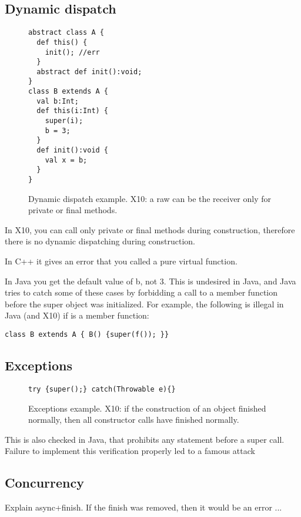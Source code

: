 \subsection{Dynamic dispatch}


\begin{figure}
\begin{lstlisting}
abstract class A {
  def this() {
    init(); //err
  }
  abstract def init():void;
}
class B extends A {
  val b:Int;
  def this(i:Int) {
    super(i);
    b = 3;
  }
  def init():void {
    val x = b;
  }
}
\end{lstlisting}
\caption{Dynamic dispatch example.
    X10: a raw \this can be the receiver only for private or final methods.}
\label{Figure:Dynamic-dispatch}
\end{figure}


In X10, you can call only private or final methods
    during construction,
    therefore there is no dynamic dispatching during construction.

In C++ it gives an error that you called a pure virtual function.

In Java you get the default value of b, not 3.
This is undesired in Java, and Java tries to catch some of these cases by
    forbidding a call to a member function before the super object was initialized.
For example, the following is illegal in Java (and X10) if  is a member function:
\begin{lstlisting}
class B extends A { B() {super(f()); }}
\end{lstlisting}



\subsection{Exceptions}


\begin{figure}
\begin{lstlisting}
try {super();} catch(Throwable e){}
\end{lstlisting}
\caption{Exceptions example.
    X10: if the construction of an object finished normally, then all constructor
        calls have finished normally.}
\label{Figure:Exceptions}
\end{figure}

This is also checked in Java, that prohibits any statement before a super call.
Failure to implement this verification properly led to a famous attack~\cite{Dean:1996}


\subsection{Concurrency}
Explain async+finish.
If the finish was removed, then it would be an error ...

